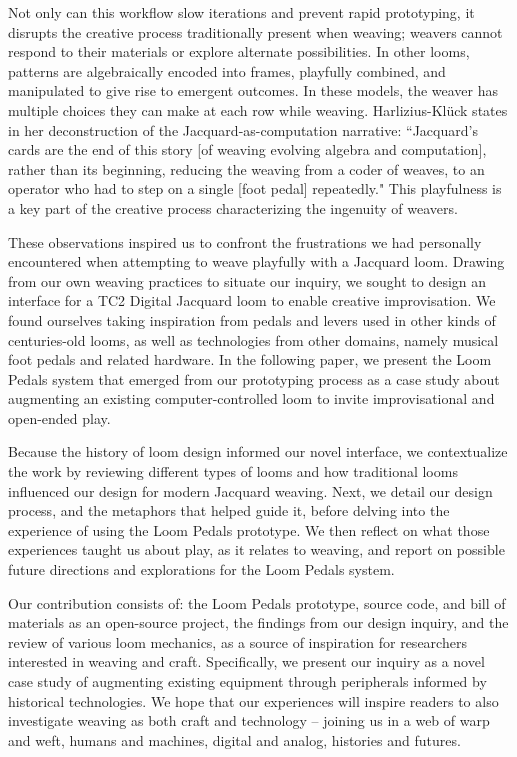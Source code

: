 Not only can this workflow slow iterations and prevent rapid prototyping, it disrupts the creative process traditionally present when weaving; weavers cannot respond to their materials or explore alternate possibilities. In other looms, patterns are algebraically encoded into frames, playfully combined, and manipulated to give rise to emergent outcomes. In these models, the weaver has multiple choices they can make at each row while weaving. Harlizius-Kl\"{u}ck states in her deconstruction of the Jacquard-as-computation narrative: “Jacquard’s cards are the end of this story [of weaving evolving algebra and computation], rather than its beginning, reducing the weaving from a coder of weaves, to an operator who had to step on a single [foot pedal] repeatedly." \cite{harlizius-kluck_weaving_2017} This playfulness is a key part of the creative process characterizing the ingenuity of weavers. 

These observations inspired us to confront the frustrations we had personally encountered when attempting to weave playfully with a Jacquard loom. Drawing from our own weaving practices to situate our inquiry, we sought to design an interface for a TC2 Digital Jacquard loom to enable creative improvisation. We found ourselves taking inspiration from pedals and levers used in other kinds of centuries-old looms, as well as technologies from other domains, namely musical foot pedals and related hardware. In the following paper, we present the Loom Pedals system that emerged from our prototyping process as a case study about augmenting an existing computer-controlled loom to invite improvisational and open-ended play. 

Because the history of loom design informed our novel interface, we contextualize the work by reviewing different types of looms and how traditional looms influenced our design for modern Jacquard weaving. Next, we detail our design process, and the metaphors that helped guide it, before delving into the experience of using the Loom Pedals prototype. We then reflect on what those experiences taught us about play, as it relates to weaving, and report on possible future directions and explorations for the Loom Pedals system.

Our contribution consists of: the Loom Pedals prototype, source code, and bill of materials as an open-source project, the findings from our design inquiry, and the review of various loom mechanics, as a source of inspiration for researchers interested in weaving and craft. Specifically, we present our inquiry as a novel case study of augmenting existing equipment through peripherals informed by historical technologies. 
We hope that our experiences will inspire readers to also investigate weaving as both craft and technology – joining us in a web of warp and weft, humans and machines, digital and analog, histories and futures.

